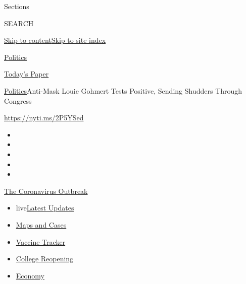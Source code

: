 Sections

SEARCH

\protect\hyperlink{site-content}{Skip to
content}\protect\hyperlink{site-index}{Skip to site index}

\href{https://www.nytimes.com/section/politics}{Politics}

\href{https://myaccount.nytimes.com/auth/login?response_type=cookie\&client_id=vi}{}

\href{https://www.nytimes.com/section/todayspaper}{Today's Paper}

\href{/section/politics}{Politics}\textbar{}Anti-Mask Louie Gohmert
Tests Positive, Sending Shudders Through Congress

\url{https://nyti.ms/2P5YSed}

\begin{itemize}
\item
\item
\item
\item
\item
\end{itemize}

\href{https://www.nytimes.com/news-event/coronavirus?action=click\&pgtype=Article\&state=default\&region=TOP_BANNER\&context=storylines_menu}{The
Coronavirus Outbreak}

\begin{itemize}
\tightlist
\item
  live\href{https://www.nytimes.com/2020/08/03/world/coronavirus-covid-19.html?action=click\&pgtype=Article\&state=default\&region=TOP_BANNER\&context=storylines_menu}{Latest
  Updates}
\item
  \href{https://www.nytimes.com/interactive/2020/us/coronavirus-us-cases.html?action=click\&pgtype=Article\&state=default\&region=TOP_BANNER\&context=storylines_menu}{Maps
  and Cases}
\item
  \href{https://www.nytimes.com/interactive/2020/science/coronavirus-vaccine-tracker.html?action=click\&pgtype=Article\&state=default\&region=TOP_BANNER\&context=storylines_menu}{Vaccine
  Tracker}
\item
  \href{https://www.nytimes.com/2020/08/02/us/covid-college-reopening.html?action=click\&pgtype=Article\&state=default\&region=TOP_BANNER\&context=storylines_menu}{College
  Reopening}
\item
  \href{https://www.nytimes.com/live/2020/08/03/business/stock-market-today-coronavirus?action=click\&pgtype=Article\&state=default\&region=TOP_BANNER\&context=storylines_menu}{Economy}
\end{itemize}

